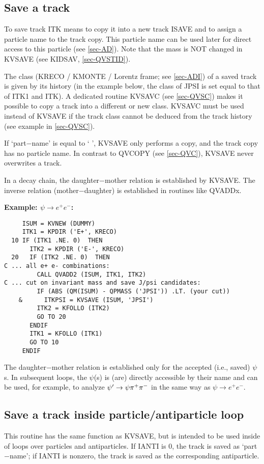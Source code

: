 \subsection{\label{sec-QVST}Save a track}
\par
To save track ITK means to copy it into a new track ISAVE and to assign
a
particle name to the track copy. This particle name can be used later
for direct access to this particle (see
\ref{sec-AD}). Note that the mass is
NOT changed in KVSAVE (see KIDSAV, \ref{sec-QVSTID}).
\par
The class (KRECO / KMONTE / Lorentz frame; see \ref{sec-ADI}) of
a saved
track is given by its history (in the example below, the class of
JPSI
is set equal to that of ITK1 and ITK). A dedicated routine
KVSAVC (see \ref{sec-QVSC}) makes it possible
to copy a track into a different or new
class. KVSAVC must be used instead of KVSAVE if the track class cannot
be deduced from the track history (see example in \ref{sec-QVSC}).
\par
If `part$-$name' is equal to ` ', KVSAVE only performs a copy, and
the
track copy has no particle name. In contrast to QVCOPY (see
\ref{sec-QVC}), KVSAVE never overwrites a track.
\par
In a decay chain, the daughter$-$mother relation is established by
KVSAVE.
The inverse relation (mother$-$daughter) is established in routines
like
QVADDx.
\par
{\bf Example: $
\psi \rightarrow e^{+}e^{-}
$:}
\begin{verbatim}
     ISUM = KVNEW (DUMMY)
     ITK1 = KPDIR ('E+', KRECO)
  10 IF (ITK1 .NE. 0)  THEN
       ITK2 = KPDIR ('E-', KRECO)
  20   IF (ITK2 .NE. 0)  THEN
C ... all e+ e- combinations:
         CALL QVADD2 (ISUM, ITK1, ITK2)
C ... cut on invariant mass and save J/psi candidates:
         IF (ABS (QM(ISUM) - QPMASS ('JPSI')) .LT. (your cut))
    &      ITKPSI = KVSAVE (ISUM, 'JPSI')
         ITK2 = KFOLLO (ITK2)
         GO TO 20
       ENDIF
       ITK1 = KFOLLO (ITK1)
       GO TO 10
     ENDIF
\end{verbatim}
\par The daughter$-$mother relation is established
only for the accepted (i.e., saved) $
\psi
$s.
In subsequent loops, the $
\psi
$(s) is (are) directly accessible by
their name and can be used, for example, to analyze
$\psi'\rightarrow \psi\pi^+\pi^-$
in the same way as
$ \psi \rightarrow e^{+}e^{-}$.
\par
\subsection{\label{sec-QVSTA}Save a track inside particle/antiparticle
loop}
\par
This routine has the same function as KVSAVE, but is intended to
be used inside of loops over particles and antiparticles.
If IANTI is 0, the track is saved as `part$-$name'; if IANTI is nonzero,
the track is saved as the corresponding antiparticle.
\par
